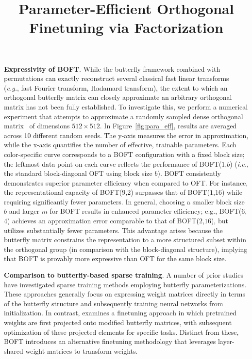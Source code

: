 \title{Parameter-Efficient Orthogonal Finetuning via Factorization}
\textbf{Expressivity of BOFT}. While the butterfly framework combined with permutations can exactly reconstruct several classical fast linear transforms~\cite{dao2019learning,dao2019kaleidoscope} (\emph{e.g.}, fast Fourier transform, Hadamard transform), the extent to which an orthogonal butterfly matrix can closely approximate an arbitrary orthogonal matrix has not been fully established. To investigate this, we perform a numerical experiment that attempts to approximate a randomly sampled dense orthogonal matrix~\cite{anderson1987generation} of dimensions $512\times 512$. In Figure~\ref{fig:para_eff}, results are averaged across 10 different random seeds. The y-axis measures the error in approximation, while the x-axis quantifies the number of effective, trainable parameters. Each color-specific curve corresponds to a BOFT configuration with a fixed block size; the leftmost data point on each curve reflects the performance of BOFT($1$,$b$) (\emph{i.e.}, the standard block-diagonal OFT using block size $b$). BOFT consistently demonstrates superior parameter efficiency when compared to OFT. For instance, the representational capacity of BOFT($9$,$2$) surpasses that of BOFT($1$,$16$) while requiring significantly fewer parameters. In general, choosing a smaller block size $b$ and larger $m$ for BOFT results in enhanced parameter efficiency; e.g., BOFT($6$,$4$) achieves an approximation error comparable to that of BOFT($2$,$16$), but utilizes substantially fewer parameters. This advantage arises because the butterfly matrix constrains the representation to a more structured subset within the orthogonal group (in comparison with the block-diagonal structure), implying that BOFT is provably more expressive than OFT for the same block size.

\textbf{Comparison to butterfly-based sparse training}. A number of prior studies~\cite{dao2019learning,dao2019kaleidoscope,chen2022pixelated,dao2022monarch} have investigated sparse training methods employing butterfly parameterizations. These approaches generally focus on expressing weight matrices directly in terms of the butterfly structure and subsequently training neural networks from initialization. In contrast, \cite{dao2022monarch} examines a finetuning approach in which pretrained weights are first projected onto modified butterfly matrices, with subsequent optimization of these projected elements for specific tasks. Distinct from these, BOFT introduces an alternative finetuning methodology that leverages layer-shared weight matrices to transform weights.

